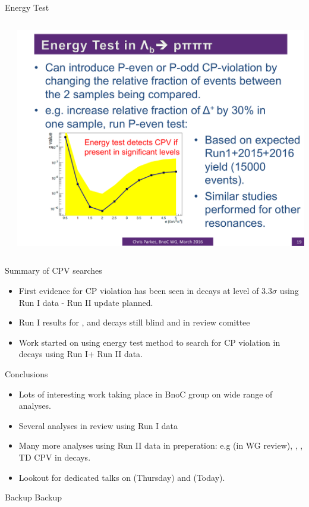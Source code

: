 \documentclass{beamer}
\begin{document}
\begin{frame}{Energy Test}
\begin{columns}
\begin{column}{.49\textwidth}
\begin{itemize}
      \end{itemize}
    \end{column}
    \begin{column}{.49\textwidth}
      \includegraphics[width=\textwidth]{SPVSensitivity.pdf}
    \end{column}
  \end{columns}
\end{frame}

\begin{frame}{Summary of  CPV searches}
  \begin{itemize}
  \item First evidence for CP violation has been seen in \decay{\Lb}{\proton \pim \pip \pim} decays at level of $3.3\sigma$ using Run I data - Run II update planned.
  \item Run I results for \decay{\Lb}{\proton \Km \pip \pim}, \decay{\Lb}{\proton \Km \Kp \Km} and \decay{\Lb}{\proton \pip \Km \Km} decays still blind and in review comittee
  \item Work started on using energy test method to search for CP violation in \decay{\Lb}{\proton \pim \pip \pim} decays using Run I+ Run II data.
  \end{itemize}
\end{frame}

\begin{frame}{Conclusions}
  \begin{itemize}
  \item Lots of interesting work taking place in BnoC group on wide range of analyses.
  \item Several analyses in review using Run I data
  \item Many more analyses using Run II data in preperation: e.g \decay{\Bs}{\phiz \phiz} (in WG review), \decay{\Bc}{\Kp\Km\pip}, \decay{\Bs}{\KS \KS}, TD CPV in  decays.
  \item Lookout for dedicated talks on \decay{\Bp}{\pip\pim\pip} (Thursday) and  (Today).
  \end{itemize}
\end{frame}
  
\appendix
\begin{frame}{Backup}
  Backup
\end{frame}
\end{document}
